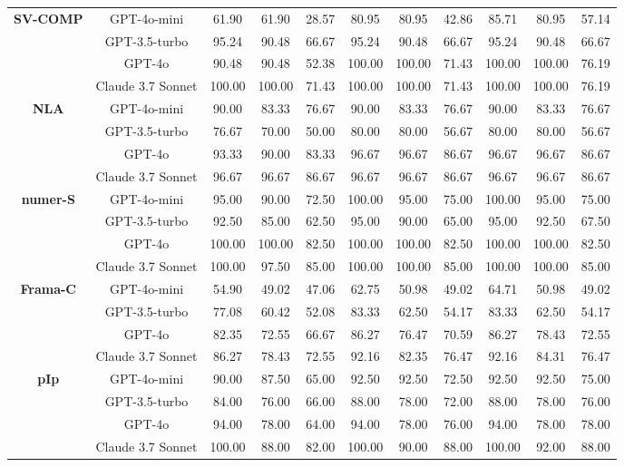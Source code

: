 \begin{table}[t]
\begin{adjustbox}{max width=\textwidth}
\begin{tabular}{cc ccc ccc ccc}
\multirow{4}{*}{\textbf{SV-COMP}}
 & GPT-4o-mini & 61.90 & 61.90 & 28.57 & 80.95 & 80.95 & 42.86 & 85.71 & 80.95 & 57.14 \\
 & GPT-3.5-turbo & 95.24 & 90.48 & 66.67 & 95.24 & 90.48 & 66.67 & 95.24 & 90.48 & 66.67 \\
 & GPT-4o & 90.48 & 90.48 & 52.38 & 100.00 & 100.00 & 71.43 & 100.00 & 100.00 & 76.19 \\
 & Claude 3.7 Sonnet & 100.00 & 100.00 & 71.43 & 100.00 & 100.00 & 71.43 & 100.00 & 100.00 & 76.19 \\
\midrule

\multirow{4}{*}{\textbf{NLA}}
 & GPT-4o-mini & 90.00 & 83.33 & 76.67 & 90.00 & 83.33 & 76.67 & 90.00 & 83.33 & 76.67 \\
 & GPT-3.5-turbo & 76.67 & 70.00 & 50.00 & 80.00 & 80.00 & 56.67 & 80.00 & 80.00 & 56.67 \\
& GPT-4o & 93.33 & 90.00 & 83.33 & 96.67 & 96.67 & 86.67 & 96.67 & 96.67 & 86.67 \\
& Claude 3.7 Sonnet & 96.67 & 96.67 & 86.67 & 96.67 & 96.67 & 86.67 & 96.67 & 96.67 & 86.67 \\
\midrule

\multirow{4}{*}{\textbf{numer-S}}
 & GPT-4o-mini & 95.00 & 90.00 & 72.50 & 100.00 & 95.00 & 75.00 & 100.00 & 95.00 & 75.00 \\
 & GPT-3.5-turbo & 92.50 & 85.00 & 62.50 & 95.00 & 90.00 & 65.00 & 95.00 & 92.50 & 67.50 \\
 & GPT-4o & 100.00 & 100.00 & 82.50 & 100.00 & 100.00 & 82.50 & 100.00 & 100.00 & 82.50 \\
 & Claude 3.7 Sonnet & 100.00 & 97.50 & 85.00 & 100.00 & 100.00 & 85.00 & 100.00 & 100.00 & 85.00 \\
\midrule

\multirow{4}{*}{\textbf{Frama-C}}
 & GPT-4o-mini & 54.90 & 49.02 & 47.06 & 62.75 & 50.98 & 49.02 & 64.71 & 50.98 & 49.02 \\
 & GPT-3.5-turbo & 77.08 & 60.42 & 52.08 & 83.33 & 62.50 & 54.17 & 83.33 & 62.50 & 54.17 \\
 & GPT-4o & 82.35 & 72.55 & 66.67 & 86.27 & 76.47 & 70.59 & 86.27 & 78.43 & 72.55 \\
 & Claude 3.7 Sonnet & 86.27 & 78.43 & 72.55 & 92.16 & 82.35 & 76.47 & 92.16 & 84.31 & 76.47 \\
\midrule

\multirow{4}{*}{\textbf{pIp}}
 & GPT-4o-mini & 90.00 & 87.50 & 65.00 & 92.50 & 92.50 & 72.50 & 92.50 & 92.50 & 75.00 \\
 & GPT-3.5-turbo & 84.00 & 76.00 & 66.00 & 88.00 & 78.00 & 72.00 & 88.00 & 78.00 & 76.00 \\
 & GPT-4o & 94.00 & 78.00 & 64.00 & 94.00 & 78.00 & 76.00 & 94.00 & 78.00 & 78.00 \\
 & Claude 3.7 Sonnet & 100.00 & 88.00 & 82.00 & 100.00 & 90.00 & 88.00 & 100.00 & 92.00 & 88.00 \\
\midrule


\end{tabular}
\end{adjustbox}
\end{table}
